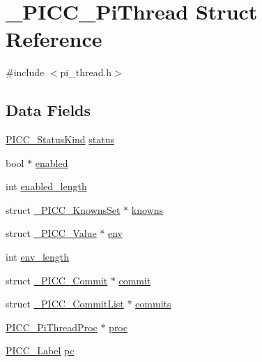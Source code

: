 \hypertarget{struct__PICC__PiThread}{\section{\-\_\-\-P\-I\-C\-C\-\_\-\-Pi\-Thread Struct Reference}
\label{struct__PICC__PiThread}
}


{\ttfamily \#include $<$pi\-\_\-thread.\-h$>$}

\subsection*{Data Fields}
{\bf }\par
\begin{DoxyCompactItemize}
\item 
\hyperlink{pi__thread_8h_ad84837e3a6881fa52eadad5f96b0444a}{P\-I\-C\-C\-\_\-\-Status\-Kind} \hyperlink{struct__PICC__PiThread_a08e8708363d2deb97335407398229118}{status}
\item 
bool $\ast$ \hyperlink{struct__PICC__PiThread_a1f2c99b2169bd58582a8b4320c2106a0}{enabled}
\item 
int \hyperlink{struct__PICC__PiThread_a0443e5525ef66064fbfb5ea4722f0fda}{enabled\-\_\-length}
\item 
struct \hyperlink{struct__PICC__KnownsSet}{\-\_\-\-P\-I\-C\-C\-\_\-\-Knowns\-Set} $\ast$ \hyperlink{struct__PICC__PiThread_aa1110c046d4ccd425e20e5a99de6dbac}{knowns}
\item 
struct \hyperlink{struct__PICC__Value}{\-\_\-\-P\-I\-C\-C\-\_\-\-Value} $\ast$ \hyperlink{struct__PICC__PiThread_a5d92f4b0053eaaca39a89c602c3b3d8b}{env}
\item 
int \hyperlink{struct__PICC__PiThread_a8fce59a9f1cf87c981af443cba62fb86}{env\-\_\-length}
\item 
struct \hyperlink{struct__PICC__Commit}{\-\_\-\-P\-I\-C\-C\-\_\-\-Commit} $\ast$ \hyperlink{struct__PICC__PiThread_a7fabb4c7acd615b20bdccd6ed32ff4f8}{commit}
\item 
struct \hyperlink{struct__PICC__CommitList}{\-\_\-\-P\-I\-C\-C\-\_\-\-Commit\-List} $\ast$ \hyperlink{struct__PICC__PiThread_af9256cdd22994cccbe76e7ef530430f8}{commits}
\item 
\hyperlink{pi__thread_8h_a0d65636a870782d26eb035fe3b841414}{P\-I\-C\-C\-\_\-\-Pi\-Thread\-Proc} $\ast$ \hyperlink{struct__PICC__PiThread_a2ad879cabbe165e57b105c4060c565a1}{proc}
\item 
\hyperlink{symbols_8h_ae23ad6ae115253385182f5a898d32c1e}{P\-I\-C\-C\-\_\-\-Label} \hyperlink{struct__PICC__PiThread_a92b638ec192f3beaa4b3a509124a539d}{pc}

\end{DoxyCompactItemize}
